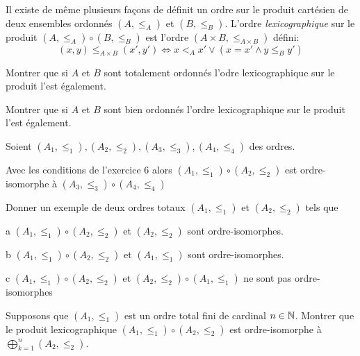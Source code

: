 \documentclass[french]{report}
\begin{document}
\begin{exo}
    Il existe de même plusieurs façons de définit un ordre sur le produit cartésien
    de deux ensembles ordonnés \(\left(A,\leq_A\right)\) et \(\left(B,\leq_B\right)\).
    L'ordre \textit{lexicographique} sur le produit \(\left(A,\leq_A\right)\circ
    \left(B,\leq_B\right)\) est l'ordre \(\left(A\times B,\leq_{A\times B}\right)\) défini:
    \[(x,y)\leq_{A\times B}(x',y')\Leftrightarrow x<_Ax'\lor\left(x=x'\land y\leq_B y'\right)\]
    \begin{q}{1}
        Montrer que si \(A\) et \(B\) sont totalement ordonnés l'odre lexicographique
        sur le produit l'est également.
    \end{q}
    \begin{q}{2}
        Montrer que si \(A\) et \(B\) sont bien ordonnés l'ordre lexicographique
        sur le produit l'est également.
    \end{q}
\end{exo}

\begin{exo}
    Soient \(\left(A_1,\leq_1\right),\left(A_2,\leq_2\right),\left(A_3,\leq_3\right),
    \left(A_4,\leq_4\right)\) des ordres.
    \begin{q}{1}
        Avec les conditions de l'exercice 6 alors
        \(\left(A_1,\leq_1\right)\circ\left(A_2,\leq_2\right)\) est ordre-isomorphe
        à \(\left(A_3,\leq_3\right)\circ\left(A_4,\leq_4\right)\)
    \end{q}
    \begin{q}{2}
        Donner un exemple de deux ordres totaux \(\left(A_1,\leq_1\right)\)
        et \(\left(A_2,\leq_2\right)\) tels que
        \begin{q}{a}
            \(\left(A_1,\leq_1\right)\circ\left(A_2,\leq_2\right)\) et
            \(\left(A_2,\leq_2\right)\) sont ordre-isomorphes.
        \end{q}
        \begin{q}{b}
            \(\left(A_1,\leq_1\right)\circ\left(A_2,\leq_2\right)\) et
            \(\left(A_1,\leq_1\right)\) sont ordre-isomorphes.
        \end{q}
        \begin{q}{c}
            \(\left(A_1,\leq_1\right)\circ\left(A_2,\leq_2\right)\) et
            \(\left(A_2,\leq_2\right)\circ\left(A_1,\leq_1\right)\) ne sont pas
            ordre-isomorphes
            \boxans{}
        \end{q}
    \end{q}
    \begin{q}{3}
        Supposons que \(\left(A_1,\leq_1\right)\) est un ordre total fini de cardinal
        \(n\in\mathbb{N}\). Montrer que le produit lexicographique
        \(\left(A_1,\leq_1\right)\circ\left(A_2,\leq_2\right)\) est ordre-isomorphe
        à \(\bigoplus_{k=1}^n \left(A_2,\leq_2\right)\).
    \end{q}
\end{exo}
\end{document}
